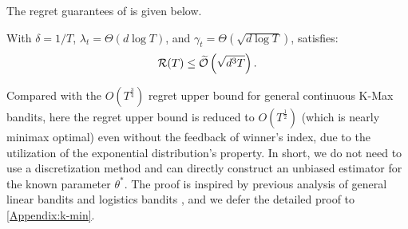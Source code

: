 The regret guarantees of  is given below.

\begin{theorem}
\label{thm:kminexp}
With $\delta = 1/T$, $\lambda_t = \Theta(d\log T)$, and $\gamma_t = \Theta(\sqrt{d\log T})$,  satisfies:
\begin{align*}
    \mathcal{R}(T) \leq \widetilde{{\mathcal{O}}}\left(\sqrt{d^3 T}\right).
\end{align*}
\end{theorem}
Compared with the $O(T^{\frac{3}{4}})$ regret upper bound for general continuous K-Max bandits, here the regret upper bound is reduced to $O(T^{\frac{1}{2}})$ (which is nearly minimax optimal) even without the feedback of winner's index, due to the utilization of the exponential distribution's property. In short, we do not need to use a discretization method and can directly construct an unbiased estimator for the known parameter $\theta^*$.
%
The proof is inspired by previous analysis of general linear bandits \citep{lee2024unified,liu2024almost} and logistics bandits \citep{liu2024combinatorial}, and we defer the detailed proof to \cref{Appendix:k-min}.
